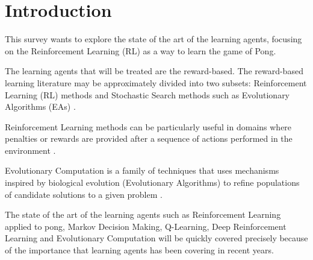 \section{Introduction}

This survey wants to explore the state of the art of the learning agents, focusing on the Reinforcement Learning (RL) as a way to learn the game of Pong.

The learning agents that will be treated are the reward-based.
The reward-based learning literature may be approximately divided into
two subsets: Reinforcement Learning (RL) methods and Stochastic Search methods such as Evolutionary Algorithms (EAs) \cite{panait2005cooperative}.

Reinforcement Learning methods can be particularly useful in domains where penalties or rewards are provided after a sequence of actions performed in the environment \cite{panait2005cooperative}.

Evolutionary Computation is a family of techniques that uses mechanisms inspired by biological evolution (Evolutionary Algorithms) to refine populations of candidate solutions to a given problem \cite{vikhar2016evolutionary}.

The state of the art of the learning agents such as Reinforcement Learning applied to pong, Markov Decision Making, Q-Learning, Deep Reinforcement Learning and Evolutionary Computation will be quickly covered precisely because of the importance that learning agents has been covering in recent years.
